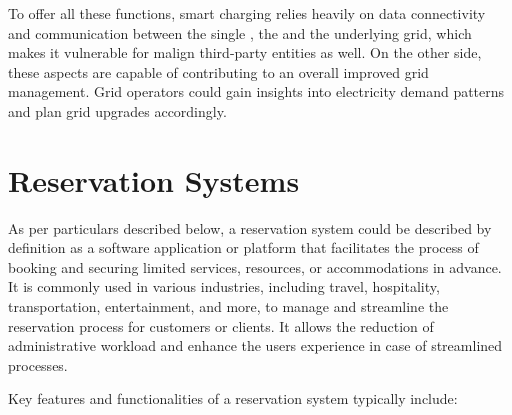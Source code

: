 To offer all these functions, smart charging relies heavily on data connectivity and communication between the single , the  and the underlying grid, which makes it vulnerable for malign third-party entities as well. On the other side, these aspects are capable of contributing to an overall improved grid management. Grid operators could gain insights into electricity demand patterns and plan grid upgrades accordingly.

\section{Reservation Systems}
\label{ch:Introduction:sec:Reservation Systems}

As per particulars described below, a reservation system could be described by definition as a software application or platform that facilitates the process of booking and securing limited services, resources, or accommodations in advance. It is commonly used in various industries, including travel, hospitality, transportation, entertainment, and more, to manage and streamline the reservation process for customers or clients. It allows the reduction of administrative workload and enhance the users experience in case of streamlined processes. 

Key features and functionalities of a reservation system typically include:

